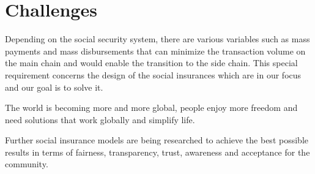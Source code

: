 \section{Challenges}

Depending on the social security system, there are various variables such as mass payments and mass disbursements that can minimize the transaction volume on the main chain and would enable the transition to the side chain. This special requirement concerns the design of the social insurances which are in our focus and our goal is to solve it.

The world is becoming more and more global, people enjoy more freedom and need solutions that work globally and simplify life.

Further social insurance models are being researched to achieve the best possible results in terms of fairness, transparency, trust, awareness and acceptance for the community.

